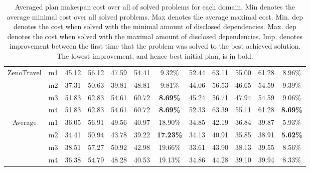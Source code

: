 \documentclass{article}
\theoremstyle{remark}
\begin{document}
\begin{table}[ht]
\begin{tabular}{|c|c|c|c|c|c|c||c|c|c|c|c|}
\multirow{4}{*}{ZenoTravel}      & m1                          & 45.12        & 56.12        & 47.59             & 54.41             & 9.32\%           & 52.44        & 63.11        & 55.00             & 61.28             & 8.96\%          \\ \cline{2-12} 
                                 & m2                          & 37.31        & 50.63        & 39.81             & 48.81             & 9.81\%           & 44.06        & 56.53        & 46.65             & 54.59             & 9.39\%          \\ \cline{2-12} 
                                 & m3                          & 51.83        & 62.83        & 54.61             & 60.72             & \textbf{8.69\%}  & 45.24        & 56.71        & 47.94             & 54.59             & 9.06\%          \\ \cline{2-12} 
                                 & m4                          & 51.83        & 62.83        & 54.61             & 60.72             & \textbf{8.69\%}  & 52.33        & 63.39        & 55.11             & 61.28             & \textbf{8.69\%} \\ \hline \hline
\multirow{4}{*}{Average}         & m1                          & 36.05        & 56.91        & 49.56             & 40.97             & 18.90\%          & 34.85        & 42.19        & 36.84             & 39.87             & 5.93\%          \\ \cline{2-12} 
                                 & m2                          & 34.41        & 50.94        & 43.78             & 39.22             & \textbf{17.23\%} & 34.13        & 40.91        & 35.85             & 38.91             & \textbf{5.62\%} \\ \cline{2-12} 
                                 & m3                          & 38.51        & 57.27        & 50.92             & 42.98             & 19.66\%          & 33.61        & 43.90        & 38.13             & 39.55             & 8.56\%          \\ \cline{2-12} 
                                 & m4                          & 36.38        & 54.79        & 48.28             & 40.53             & 19.13\%          & 34.86        & 44.28        & 39.10             & 39.94             & 8.33\%          \\ \hline
\end{tabular}
\caption{Averaged plan makespan cost over all of solved problems for each domain. Min denotes the average minimal cost over all solved problems.
Max denotes the average maximal cost.
Min. dep denotes the cost when solved with the minimal amount of disclosed dependencies.
Max. dep denotes the cost when solved with the maximal amount of disclosed dependencies.
Imp. denotes improvement between the first time that the problem was solved to the best achieved solution.
The lowest improvement, and hence best initial plan, is in bold.}
\label{table:costTable}
\end{table}
\end{document}
